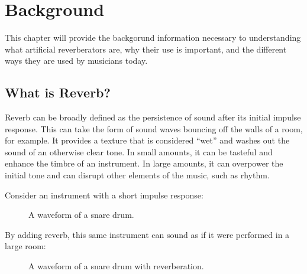 \chapter{Background}
\hspace*{-0.155cm}This chapter will provide the backgorund information necessary to understanding what artificial reverberators are, why their use is important, and the different ways they are used by musicians today.

\section{What is Reverb?}
Reverb can be broadly defined as the persistence of sound after its initial impulse response. This can take the form of sound waves bouncing off the walls of a room, for example. It provides a texture that is considered ``wet'' and washes out the sound of an otherwise clear tone. In small amounts, it can be tasteful and enhance the timbre of an instrument. In large amounts, it can overpower the initial tone and can disrupt other elements of the music, such as rhythm.

Consider an instrument with a short impulse response:

\begin{figure}[h] %
	\begin{center}
		\caption{A waveform of a snare drum.}
	\end{center}
\end{figure}

By adding reverb, this same instrument can sound as if it were performed in a large room:

\begin{figure}[h] %
	\begin{center}
		\caption{A waveform of a snare drum with reverberation.}
	\end{center}
\end{figure} %


